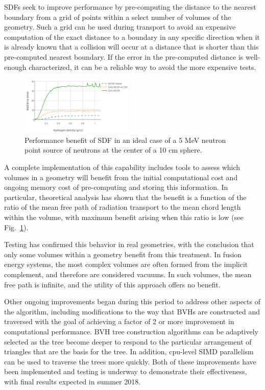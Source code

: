 \glspl{SDF} seek to improve performance by pre-computing the distance to the
nearest boundary from a grid of points within a select number of volumes of
the geometry.  Such a grid can be used during transport to avoid an expensive
computation of the exact distance to a boundary in any specific direction when
it is already known that a collision will occur at a distance that is shorter
than this pre-computed nearest boundary.  If the error in the pre-computed
distance is well-enough characterized, it can be a reliable way to avoid the
more expensive tests.

\begin{figure}
\centering
\includegraphics[width=0.48\textwidth]{imgs/sdf-best-case.png}
\caption{\label{fig:sdf-best-case}Performance benefit of \gls{SDF} in an ideal
  case of a 5 MeV neutron point source of neutrons at the center of a 10 cm
  sphere.}
\end{figure}

A complete implementation of this capability includes tools to assess which
volumes in a geometry will benefit from the initial computational cost and
ongoing memory cost of pre-computing and storing this information.  In
particular, theoretical analysis has shown that the benefit is a function of
the ratio of the mean free path of radiation transport to the mean chord
length within the volume, with maximum benefit arising when this ratio is
low (see Fig.\ \ref{fig:sdf-best-case}).

Testing has confirmed this behavior in real geometries, with the conclusion
that only some volumes within a geometry benefit from this treatment.  In
fusion energy systems, the most complex volumes are often formed from the
implicit complement, and therefore are considered vacuums.  In such volumes,
the mean free path is infinite, and the utility of this approach offers no
benefit.

Other ongoing improvements began during this period to address other aspects
of the algorithm, including modifications to the way that \glspl{BVH} are
constructed and traversed with the goal of achieving a factor of 2 or more
improvement in computational performance.  \gls{BVH} tree construction
algorithms can be adaptively selected as the tree become deeper to respond to
the particular arrangement of triangles that are the basis for the tree.  In
addition, cpu-level \gls{SIMD} parallelism can be used to traverse the trees
more quickly. Both of these improvements have been
implemented and testing is underway to demonstrate their effectiveness, with
final results expected in summer 2018.

